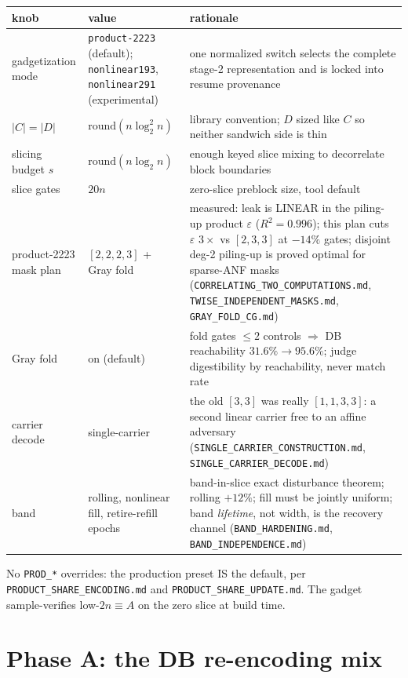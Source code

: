 \documentclass[11pt]{article}
\newcommand{\doc}[1]{\texttt{#1}}
\begin{document}
\begin{table}[H]\small
\begin{tabular}{L{3.2cm} L{3.2cm} L{8.2cm}}
\toprule
knob & value & rationale \\
\midrule
gadgetization mode & \texttt{product-2223} (default); \texttt{nonlinear193}, \texttt{nonlinear291} (experimental) & one normalized switch selects the complete stage-2 representation and is locked into resume provenance \\
$|C|=|D|$ & $\mathrm{round}(n\log_2^2 n)$ & library convention; $D$ sized like $C$ so neither sandwich side is thin \\
slicing budget $s$ & $\mathrm{round}(n\log_2 n)$ & enough keyed slice mixing to decorrelate block boundaries \\
slice gates & $20n$ & zero-slice preblock size, tool default \\
product-2223 mask plan & $[2,2,2,3]$ + Gray fold & measured: leak is LINEAR in the piling-up product $\varepsilon$ ($R^2=0.996$); this plan cuts $\varepsilon$ $3\times$ vs $[2,3,3]$ at $-14\%$ gates; disjoint deg-2 piling-up is proved optimal for sparse-ANF masks (\doc{CORRELATING\_TWO\_COMPUTATIONS.md}, \doc{TWISE\_INDEPENDENT\_MASKS.md}, \doc{GRAY\_FOLD\_CG.md}) \\
Gray fold & on (default) & fold gates $\le 2$ controls $\Rightarrow$ DB reachability $31.6\%\to95.6\%$; judge digestibility by reachability, never match rate \\
carrier decode & single-carrier & the old $[3,3]$ was really $[1,1,3,3]$: a second linear carrier free to an affine adversary (\doc{SINGLE\_CARRIER\_CONSTRUCTION.md}, \doc{SINGLE\_CARRIER\_DECODE.md}) \\
band & rolling, nonlinear fill, retire-refill epochs & band-in-slice exact disturbance theorem; rolling $+12\%$; fill must be jointly uniform; band \emph{lifetime}, not width, is the recovery channel (\doc{BAND\_HARDENING.md}, \doc{BAND\_INDEPENDENCE.md}) \\
\bottomrule
\end{tabular}
\end{table}

No \texttt{PROD\_*} overrides: the production preset IS the default, per
\doc{PRODUCT\_SHARE\_ENCODING.md} and \doc{PRODUCT\_SHARE\_UPDATE.md}. The
gadget sample-verifies low-$2n \equiv A$ on the zero slice at build time.

\section{Phase A: the DB re-encoding mix}
\end{document}
